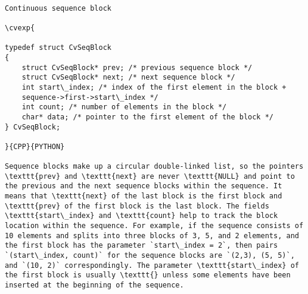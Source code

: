 \begin{verbatim}

Continuous sequence block

\cvexp{

typedef struct CvSeqBlock
{
    struct CvSeqBlock* prev; /* previous sequence block */
    struct CvSeqBlock* next; /* next sequence block */
    int start\_index; /* index of the first element in the block +
    sequence->first->start\_index */
    int count; /* number of elements in the block */
    char* data; /* pointer to the first element of the block */
} CvSeqBlock;

}{CPP}{PYTHON}

Sequence blocks make up a circular double-linked list, so the pointers \texttt{prev} and \texttt{next} are never \texttt{NULL} and point to the previous and the next sequence blocks within the sequence. It means that \texttt{next} of the last block is the first block and \texttt{prev} of the first block is the last block. The fields \texttt{start\_index} and \texttt{count} help to track the block location within the sequence. For example, if the sequence consists of 10 elements and splits into three blocks of 3, 5, and 2 elements, and the first block has the parameter `start\_index = 2`, then pairs `(start\_index, count)` for the sequence blocks are `(2,3), (5, 5)`, and `(10, 2)` correspondingly. The parameter \texttt{start\_index} of the first block is usually \texttt{} unless some elements have been inserted at the beginning of the sequence.


\end{verbatim}
\label{CvSlice}
